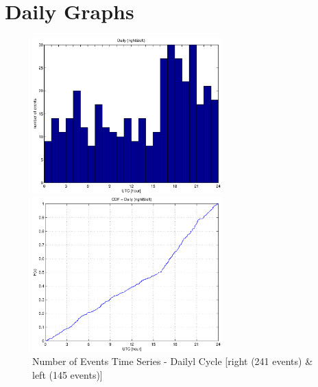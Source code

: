 \documentclass[a4paper,11pt]{article}
\begin{document}
\section{ Daily Graphs}
\begin{figure}[htbp]
\begin{minipage}{0.55\hsize}
\centering
\includegraphics[width=7.3cm, clip]{histTimeDaily.eps}
\end{minipage}
\begin{minipage}{0.55\hsize}
 \centering
\includegraphics[width=7.3cm, clip]{CDFTimeDaily.eps}
\end{minipage}
\caption{Number of Events Time Series - Dailyl Cycle [right (241 events) \& left (145 events)]}
\end{figure}
\end{document}
